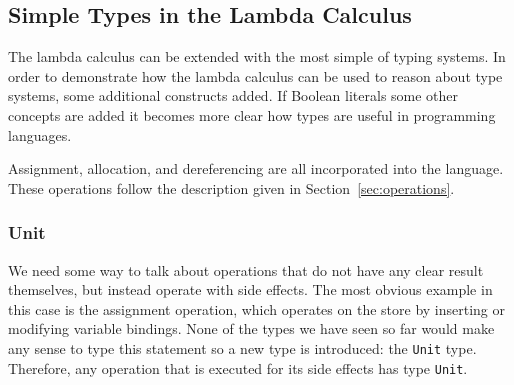 \subsection{Simple Types in the Lambda Calculus}
The lambda calculus can be extended with the most simple of typing systems.
In order to demonstrate how the lambda calculus can be used to reason about
type systems, some additional constructs added. If Boolean literals some other
concepts are added it becomes more clear how types are useful in programming
languages.

Assignment, allocation, and dereferencing are all incorporated into the language.
These operations follow the description given in Section~\ref{sec:operations}.

\subsubsection{Unit}
We need some way to talk about operations that do not have any clear result
themselves, but instead operate with side effects. The most obvious example in
this case is the assignment operation, which operates on the store by inserting
or modifying variable bindings. None of the types we have seen so far would
make any sense to type this statement so a new type is introduced: the
\lstinline{Unit} type.  Therefore, any operation that is executed for its side
effects has type \lstinline{Unit}.


